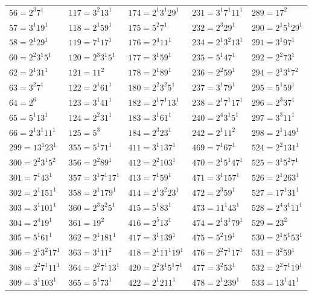 {\begin{longtable}[c]{*{5}{l}}
$56=2^{3}7^{1}$&$117=3^{2}13^{1}$&$174=2^{1}3^{1}29^{1}$&$231=3^{1}7^{1}11^{1}$&$289=17^{2}$\\
$57=3^{1}19^{1}$&$118=2^{1}59^{1}$&$175=5^{2}7^{1}$&$232=2^{3}29^{1}$&$290=2^{1}5^{1}29^{1}$\\
$58=2^{1}29^{1}$&$119=7^{1}17^{1}$&$176=2^{4}11^{1}$&$234=2^{1}3^{2}13^{1}$&$291=3^{1}97^{1}$\\
$60=2^{2}3^{1}5^{1}$&$120=2^{3}3^{1}5^{1}$&$177=3^{1}59^{1}$&$235=5^{1}47^{1}$&$292=2^{2}73^{1}$\\
$62=2^{1}31^{1}$&$121=11^{2}$&$178=2^{1}89^{1}$&$236=2^{2}59^{1}$&$294=2^{1}3^{1}7^{2}$\\
$63=3^{2}7^{1}$&$122=2^{1}61^{1}$&$180=2^{2}3^{2}5^{1}$&$237=3^{1}79^{1}$&$295=5^{1}59^{1}$\\
$64=2^{6}$&$123=3^{1}41^{1}$&$182=2^{1}7^{1}13^{1}$&$238=2^{1}7^{1}17^{1}$&$296=2^{3}37^{1}$\\
$65=5^{1}13^{1}$&$124=2^{2}31^{1}$&$183=3^{1}61^{1}$&$240=2^{4}3^{1}5^{1}$&$297=3^{3}11^{1}$\\
$66=2^{1}3^{1}11^{1}$&$125=5^{3}$&$184=2^{3}23^{1}$&$242=2^{1}11^{2}$&$298=2^{1}149^{1}$\\
\newpage
$299=13^{1}23^{1}$&$355=5^{1}71^{1}$&$411=3^{1}137^{1}$&$469=7^{1}67^{1}$&$524=2^{2}131^{1}$\\
$300=2^{2}3^{1}5^{2}$&$356=2^{2}89^{1}$&$412=2^{2}103^{1}$&$470=2^{1}5^{1}47^{1}$&$525=3^{1}5^{2}7^{1}$\\
$301=7^{1}43^{1}$&$357=3^{1}7^{1}17^{1}$&$413=7^{1}59^{1}$&$471=3^{1}157^{1}$&$526=2^{1}263^{1}$\\
$302=2^{1}151^{1}$&$358=2^{1}179^{1}$&$414=2^{1}3^{2}23^{1}$&$472=2^{3}59^{1}$&$527=17^{1}31^{1}$\\
$303=3^{1}101^{1}$&$360=2^{3}3^{2}5^{1}$&$415=5^{1}83^{1}$&$473=11^{1}43^{1}$&$528=2^{4}3^{1}11^{1}$\\
$304=2^{4}19^{1}$&$361=19^{2}$&$416=2^{5}13^{1}$&$474=2^{1}3^{1}79^{1}$&$529=23^{2}$\\
$305=5^{1}61^{1}$&$362=2^{1}181^{1}$&$417=3^{1}139^{1}$&$475=5^{2}19^{1}$&$530=2^{1}5^{1}53^{1}$\\
$306=2^{1}3^{2}17^{1}$&$363=3^{1}11^{2}$&$418=2^{1}11^{1}19^{1}$&$476=2^{2}7^{1}17^{1}$&$531=3^{2}59^{1}$\\
$308=2^{2}7^{1}11^{1}$&$364=2^{2}7^{1}13^{1}$&$420=2^{2}3^{1}5^{1}7^{1}$&$477=3^{2}53^{1}$&$532=2^{2}7^{1}19^{1}$\\
$309=3^{1}103^{1}$&$365=5^{1}73^{1}$&$422=2^{1}211^{1}$&$478=2^{1}239^{1}$&$533=13^{1}41^{1}$\\

\end{longtable}}
